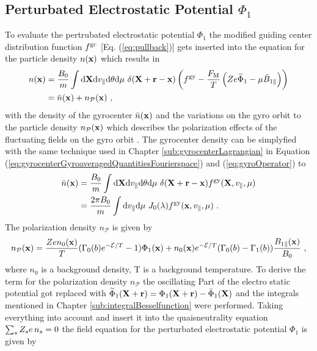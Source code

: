 \newpage

\subsection{Perturbated Electrostatic Potential $\Phi_1$}
\label{sub:fieldPotential}

To evaluate the pertrubated electrostatic potential $\Phi_1$ the modified guiding center distribution function $f^{\mathrm{gc}}$ [Eq. (\ref{eq:pullback})] gets inserted into the equation for the particle density $n(\boldsymbol{\mathbf{x}})$ which results in
\begin{gather}
	\begin{aligned}
		n(\boldsymbol{\mathbf{x}}) &= \frac{B_0}{m} \int \mathrm{d}\boldsymbol{\mathbf{X}}\mathrm{d}v_\parallel\mathrm{d}\theta\mathrm{d}\mu ~ \delta(\boldsymbol{\mathbf{X}} + \boldsymbol{\mathbf{r}} - \boldsymbol{\mathbf{x}}) \left(f^{\mathrm{gy}} - \frac{F_\mathrm{M}}{T}\left(Ze \widetilde{\Phi}_1 - \mu \bar{B}_{1\parallel}\right) \right)\\
		     &= \bar{n}(\boldsymbol{\mathbf{x}}) + n_\mathcal{P}(\boldsymbol{\mathbf{x}})~,
	\end{aligned}
	\label{densityPullback}
\end{gather}
with the density of the gyrocenter $\bar{n}(\boldsymbol{\mathbf{x}})$ and the variations on the gyro orbit to the particle density $n_\mathcal{P}(\boldsymbol{\mathbf{x}})$ which describes the polarization effects of the fluctuating fields on the gyro orbit \source. The gyrocenter density can be simplyfied with the same technique used in Chapter \ref{sub:gyrocenterLagrangian} in Equation (\ref{eq:gyrocenterGyroaveragedQuantitiesFourierspace}) and (\ref{eq:gyroOperator}) to
\begin{gather}
	\begin{aligned}
		\bar{n}(\boldsymbol{\mathbf{x}}) &= \frac{B_0}{m} \int \mathrm{d}\boldsymbol{\mathbf{X}}\mathrm{d}v_\parallel\mathrm{d}\theta\mathrm{d}\mu ~ \delta(\boldsymbol{\mathbf{X}} + \boldsymbol{\mathbf{r}} - \boldsymbol{\mathbf{x}}) f^{\mathrm{gy}}(\boldsymbol{\mathbf{X}}, v_\parallel, \mu) \\
		     		&= \frac{2\pi B_0}{m} \int \mathrm{d}v_\parallel\mathrm{d}\mu ~ J_0(\lambda) f^{\mathrm{gy}}(\boldsymbol{\mathbf{x}}, v_\parallel, \mu)~.
	\end{aligned}
	\label{eq:gyrocenterDensity}
\end{gather}
The polarization density $n_\mathcal{P}$ is given by
\begin{gather}
	n_\mathcal{P}(\boldsymbol{\mathbf{x}}) = \frac{Ze n_0(\boldsymbol{\mathbf{x}})}{T} (\Gamma_0(b)e^{-\mathcal{E}/T} - 1) \Phi_1(\boldsymbol{\mathbf{x}}) + n_0(\boldsymbol{\mathbf{x}}) e^{-\mathcal{E}/T} (\Gamma_0(b) - \Gamma_1(b))\frac{B_{1\parallel}(\boldsymbol{\mathbf{x}})}{B_0}~,
	\label{eq:polarizationDensity}
\end{gather}
where $n_0$ is a background density, T is a background temperature. To derive the term for the polarization density $n_\mathcal{P}$ the oscillating Part of the electro static potential got replaced with $\widetilde{\Phi}_1(\boldsymbol{\mathbf{X}}+ \boldsymbol{\mathbf{r}}) = \Phi_1(\boldsymbol{\mathbf{X}} + \boldsymbol{\mathbf{r}}) - \bar{\Phi}_1 (\boldsymbol{\mathbf{X}})$ and the integrals mentioned in Chapter \ref{sub:integralBesselfunction} were performed. Taking everything into account and insert it into the quaisneutrality equation $\sum_s Z_s e \, n_s = 0$ the field equation for the perturbated electrostatic potential $\Phi_1$ is given by
